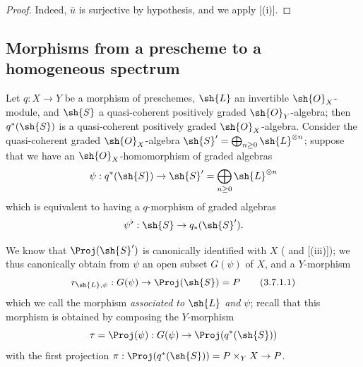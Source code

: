 \begin{proof}
Indeed, $\overline{u}$ is surjective by hypothesis, and we apply [(i)].
\end{proof}


\subsection{Morphisms from a prescheme to a homogeneous spectrum}
\label{subsection:II.3.7}

\begin{env}[3.7.1]
\label{II.3.7.1}
Let $q:X\to Y$ be a morphism of preschemes, $\sh{L}$ an invertible $\sh{O}_X$-module, and $\sh{S}$ a quasi-coherent positively graded $\sh{O}_Y$-algebra;
then $q^*(\sh{S})$ is a quasi-coherent positively graded $\sh{O}_X$-algebra.
Consider the quasi-coherent graded $\sh{O}_X$-algebra $\sh{S}'=\bigoplus_{n\geq0}\sh{L}^{\otimes n}$;
suppose that we have an $\sh{O}_X$-homomorphism of graded algebras
\[
  \psi : q^*(\sh{S}) \to \sh{S}' = \bigoplus_{n\geq0}\sh{L}^{\otimes n}
\]
which is equivalent to having a $q$-morphism of graded algebras
\[
  \psi^\flat : \sh{S} \to q_*(\sh{S}').
\]

We know that $\Proj(\sh{S}')$ is canonically identified with $X$ ( and [(iii)]);
we thus canonically obtain from $\psi$ an open subset $G(\psi)$ of $X$, and a $Y$-morphism
\[
\label{II.3.7.1.1}
  r_{\sh{L},\psi} : G(\psi) \to \Proj(\sh{S}) = P
\tag{3.7.1.1}
\]
which we call the morphism \emph{associated to $\sh{L}$ and $\psi$};
recall  that this morphism is obtained by composing the $Y$-morphism
\[
  \tau = \Proj(\psi) : G(\psi) \to \Proj(q^*(\sh{S}))
\]
with the first projection $\pi:\Proj(q^*(\sh{S}))=P\times_Y X\to P$.
\end{env}

